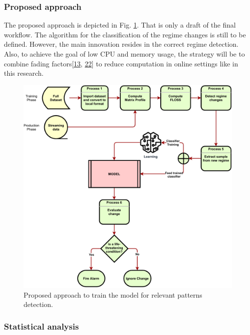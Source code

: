 \documentclass[runningheads]{llncs}
\begin{document}
\hypertarget{proposed-approach}{%
\subsubsection{Proposed approach}\label{proposed-approach}}

The proposed approach is depicted in Fig. \ref{fig:workflow_image}. That
is only a draft of the final workflow. The algorithm for the
classification of the regime changes is still to be defined. However,
the main innovation resides in the correct regime detection. Also, to
achieve the goal of low CPU and memory usage, the strategy will be to
combine fading factors{[}\protect\hyperlink{ref-Gama2013}{13},
\protect\hyperlink{ref-Rodrigues2010}{22}{]} to reduce computation in
online settings like in this research.

\begin{figure}
\includegraphics[width=1\linewidth]{false_alarm} \caption{Proposed approach to train the model for relevant patterns detection.}\label{fig:workflow_image}
\end{figure}

\hypertarget{statistical-analysis}{%
\subsubsection{Statistical analysis}\label{statistical-analysis}}
\end{document}
